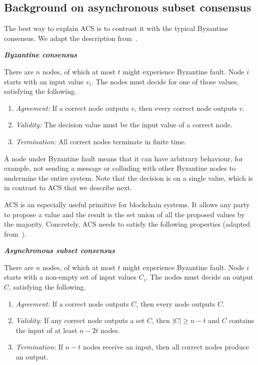 \subsection{Background on asynchronous subset consensus}
\label{sec:acs-background}

The best way to explain ACS is to contrast it with the typical Byzantine consensus.
We adapt the description from~\cite[Chapter 17]{podc}.
\begin{definition}
\textbf{\emph{Byzantine consensus}}

There are $n$ nodes, of which at most $t$ might experience Byzantine fault.
Node $i$ starts with an input value $v_i$.
The nodes must decide for one of  those values, satisfying the following.
\begin{enumerate}
    \item \emph{Agreement:}
        If a correct node outputs $v$, then every correct node outputs $v$.
    \item \emph{Validity:}
        The decision value must be the input value of a correct node.
    \item \emph{Termination:}
        All correct nodes terminate in finite time.
\end{enumerate}
\end{definition}
A node under Byzantine fault means that it can have arbitrary behaviour,
for example, not sending a message or colluding with other Byzantine nodes to undermine the entire system.
Note that the decision is on a single value,
which is in contrast to ACS that we describe next.

ACS is an especially useful primitive for blockchain systems.
It allows any party to propose a value and the result is the set union of all the proposed values by the majority.
Concretely, ACS needs to satisfy the following properties (adapted from~\cite{miller2016honey}).
\begin{definition}
\label{def:acs}
\textbf{\emph{Asynchronous subset consensus}}

There are $n$ nodes, of which at most $t$ might experience Byzantine fault.
Node $i$ starts with a non-empty set of input values $C_i$.
The nodes must decide an output $C$, satisfying the following.
\begin{enumerate}
    \item \emph{Agreement:}
        If a correct node outputs $C$, then every node outputs $C$.
    \item \emph{Validity:}
        If any correct node outputs a set $C$,
        then $|C| \ge n - t$ and $C$ contains the input of at least $n - 2t$ nodes.
    \item \emph{Termination:}
        If $n - t$ nodes receive an input, then all correct nodes produce an output.
\end{enumerate}
\end{definition}

